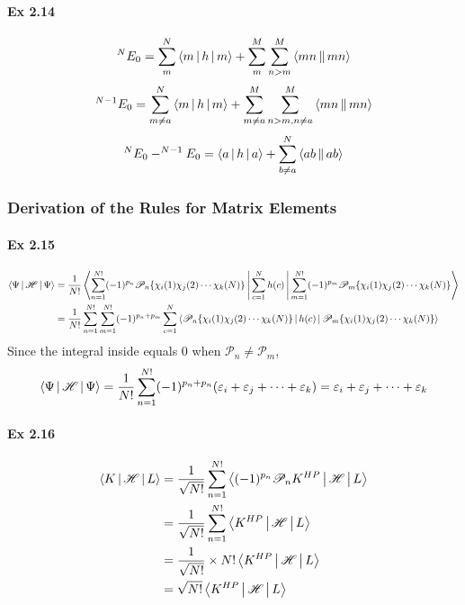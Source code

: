 \documentclass[a4paper]{article}
\newcommand{\ex}[1]{\paragraph{Ex #1}}
\numberwithin{equation}{subsection}
\begin{document}
\ex{2.14}
\begin{equation}\label{key}
^N E_0 = \sum_m^N \Braket{m|h|m} + \sum_m^M\sum_{n>m}^M \Braket{mn||mn}
\end{equation}
\begin{equation}\label{key}
^{N-1}E_0 = \sum_{m\neq a}^N \Braket{m|h|m} + \sum_{m\neq a}^M\sum_{n>m, n\neq a}^M \Braket{mn||mn}
\end{equation}
\begin{equation}\label{key}
^N E_0 - ^{N-1}E_0 = \Braket{a|h|a} + \sum_{b\neq a}^N \Braket{ab||ab}
\end{equation}

\subsubsection{Derivation of the Rules for Matrix Elements}
\ex{2.15}
\begin{equation}\label{key}
\begin{aligned}
\Braket{\Psi | \mathscr{H} | \Psi} &= \dfrac{1}{N!} \Braket{\sum_{n=1}^{N!} (-1)^{p_n}\mathscr{P}_n\{\chi_i(1)\chi_j(2)\cdots\chi_k(N)\} | \sum_{c=1}^N h(c) | \sum_{m=1}^{N!} (-1)^{p_m}\mathscr{P}_m\{\chi_i(1)\chi_j(2)\cdots\chi_k(N)\}}\\
&= \dfrac{1}{N!} \sum_{n=1}^{N!} \sum_{m=1}^{N!} (-1)^{p_n + p_m} \sum_{c=1}^N \Braket{ \mathscr{P}_n \{\chi_i(1)\chi_j(2)\cdots\chi_k(N)\} |  h(c) | \mathscr{P}_m \{ \chi_i(1)\chi_j(2)\cdots\chi_k(N)\}}\\
\end{aligned}
\end{equation}
Since the integral inside equals $ 0 $ when $ \mathscr{P}_n \neq \mathscr{P}_m $,
\begin{equation}\label{key}
\Braket{\Psi | \mathscr{H} | \Psi} = \dfrac{1}{N!} \sum_{n=1}^{N!} (-1)^{p_n + p_n} (\varepsilon_i+\varepsilon_j+\cdots+\varepsilon_k) = \varepsilon_i+\varepsilon_j+\cdots+\varepsilon_k
\end{equation}

\ex{2.16}
%
\begin{align}\label{key}
\Braket{K | \mathscr{H} | L} &= \dfrac{1}{\sqrt{N!}} \sum_{n=1}^{N!}  \Braket{(-1)^{p_n} \mathscr{P}_n K^{HP} | \mathscr{H} | L} \notag\\
&= \dfrac{1}{\sqrt{N!}} \sum_{n=1}^{N!}  \Braket{  K^{HP} | \mathscr{H} | L} \notag\\
&= \dfrac{1}{\sqrt{N!}} \times N! \Braket{  K^{HP} | \mathscr{H} | L} \notag\\
&= \sqrt{N!} \Braket{  K^{HP} | \mathscr{H} | L}
\end{align}
\end{document}
